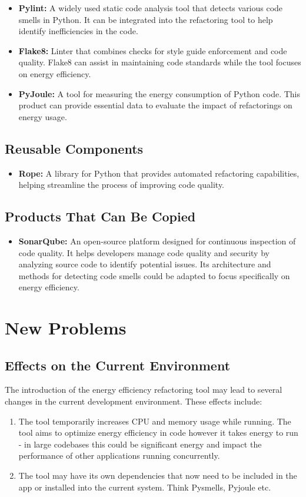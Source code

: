 \documentclass[12pt]{article}
\begin{document}
\begin{itemize}
  \item \textbf{Pylint:} A widely used static code analysis tool that
    detects various code smells in Python. It can be integrated into
    the refactoring tool to help identify inefficiencies in the code.
  \item \textbf{Flake8:} Linter that combines checks for style guide
    enforcement and code quality. Flake8 can assist in maintaining
    code standards while the tool focuses on energy efficiency.
  \item \textbf{PyJoule:} A tool for measuring the energy consumption
    of Python code. This product can provide essential data to
    evaluate the impact of refactorings on energy usage.
\end{itemize}

\subsection{Reusable Components}
\begin{itemize}
  \item \textbf{Rope:} A library for Python that provides automated
    refactoring capabilities, helping streamline the process of
    improving code quality.
\end{itemize}
\subsection{Products That Can Be Copied}
\begin{itemize}
  \item \textbf{SonarQube:} An open-source platform designed for
    continuous inspection of code quality. It helps developers manage
    code quality and security by analyzing source code to identify
    potential issues. Its architecture and methods for detecting code
    smells could be adapted to focus specifically on energy efficiency.
\end{itemize}

\section{New Problems}
\subsection{Effects on the Current Environment}
The introduction of the energy efficiency refactoring tool may lead
to several changes in the current development environment. These
effects include:
\begin{enumerate}
  \item The tool temporarily increases CPU and memory usage while
    running. The tool aims to optimize energy efficiency in code
    however it takes energy to run - in large codebases this could be
    significant energy and impact the performance of other
    applications running concurrently.
  \item The tool may have its own dependencies that now need to be
    included in the app or installed into the current system. Think
    Pysmells, Pyjoule etc.
\end{enumerate}
\end{document}
